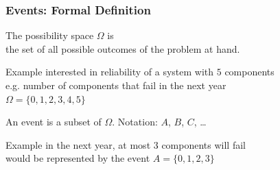 \documentclass{beamer}
\begin{document}
\begin{frame}
  \frametitle{Events: Formal Definition}
  \begin{definition}
    The \alert{possibility space} $\Omega$ is \\
    the set of all possible outcomes of the problem at hand.
  \end{definition}
  \vspace*{-1ex}
  \begin{exampleblock}{Example}
    interested in reliability of a system with $5$ components \\
    e.g. number of components that fail in the next year \\
    $\Omega=\{0,1,2,3,4,5\}$
  \end{exampleblock}
\pause
  \begin{definition}
    An \alert{event} is a subset of $\Omega$.
    \hspace{2em}
    Notation: $A$, $B$, $C$, \dots
  \end{definition} 
  \vspace*{-1ex}
  \begin{exampleblock}{Example}
    in the next year, at most 3 components will fail
    \\
    would be represented by the event $A=\{0,1,2,3\}$
  \end{exampleblock}
\end{frame}
\end{document}

